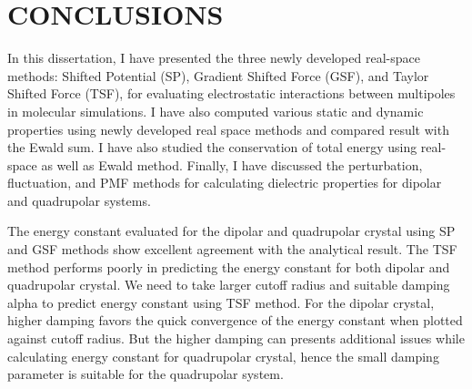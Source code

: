 %
%
%
%
%
%
%
%
%
%


%
%

\chapter{CONCLUSIONS}
In this dissertation, I have presented the three newly developed real-space methods: Shifted Potential (SP), Gradient Shifted Force (GSF), and Taylor Shifted Force (TSF), for evaluating electrostatic interactions between multipoles in molecular simulations. I have also computed various static and dynamic properties using newly developed real space methods and compared result with the Ewald sum. I have also studied the conservation of total energy using real-space as well as Ewald method. Finally, I have discussed the perturbation, fluctuation, and PMF methods for calculating dielectric properties for dipolar and quadrupolar systems.

The energy constant evaluated for the dipolar and quadrupolar crystal using SP and GSF methods show excellent agreement with the analytical result. The TSF method performs poorly in predicting the energy constant for both dipolar and quadrupolar crystal. We need to take larger cutoff radius and suitable damping alpha to predict energy constant using TSF method. For the dipolar crystal, higher damping favors the quick convergence of the energy constant when plotted against cutoff radius. But the higher damping can presents additional issues while calculating energy constant for quadrupolar crystal, hence the small damping parameter is suitable for the quadrupolar system.     

